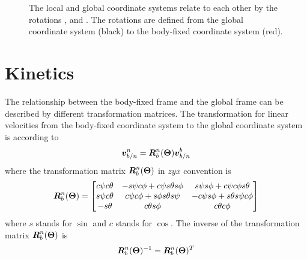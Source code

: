 \begin{figure}
    \caption{The local and global coordinate systems relate to each other by the rotations \yawAngle, \pitchAngle and \rollAngle. The rotations are defined from the global coordinate system (black) to the body-fixed coordinate system (red).} 
    \label{fig:coordinate_frames}
\end{figure}

\section{Kinetics}  \label{sec:kinetics}
The relationship between the body-fixed frame and the global frame can be described by different transformation matrices.
The transformation for linear velocities from the body-fixed coordinate system to the global coordinate system is according to \citet[22]{fossen2011} 
\begin{equation}
\boldsymbol{v}^n_{b/n} = \boldsymbol{R}^n_b(\boldsymbol{\Theta}) \boldsymbol{v}^b_{b/n}
\end{equation}
where the transformation matrix $\boldsymbol{R}^n_b(\boldsymbol{\Theta})$ in $zyx$ convention is 
\begin{equation}
\boldsymbol{R}^n_b(\boldsymbol{\Theta}) =\begin{bmatrix}
 c\psi c\theta & -s\psi c\phi + c\psi s\theta s\phi & s\psi s\phi + c\psi c\phi s \theta \\
 s\psi c\theta & c\psi c\phi + s\phi  s\theta s\psi & -c\psi s\phi + s\theta s\psi c\phi \\
 -s\theta & c\theta s\phi & c\theta c\phi
 \end{bmatrix} 
\end{equation}
where $s$ stands for $\sin$ and $c$ stands for $\cos$. The inverse of the transformation matrix $\boldsymbol{R}^n_b(\boldsymbol{\Theta})$ is
\begin{equation}
\boldsymbol{R}^n_b(\boldsymbol{\Theta})^{-1} = \boldsymbol{R}^n_b(\boldsymbol{\Theta})^T
\end{equation}

